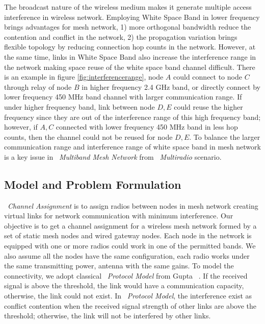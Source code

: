 The broadcast nature of the wireless medium makes it generate multiple access interference in wireless network.
Employing White Space Band in lower frequency brings advantages for mesh network, 1) more orthogonal bandwidth reduce the contention and conflict in the network,
 2) the propagation variation brings flexible topology by reducing connection hop counts in the network.
However, at the same time, links in White Space Band also increase the interference range in the network making space reuse of the white space band channel difficult. 
There is an example in figure \ref{fig:interferencerange}, node $A$  could connect to node $C$ through relay of node $B$ in higher frequency 2.4 GHz band, or directly connect by lower frequency 450 MHz band channel with larger communication range.
If under higher frequency band, link between node $D,E$ could reuse the higher frequency since they are out of the interference range of this high frequency band; 
however, if $A,C$ connected with lower frequency 450 MHz band in less hop counts, then the channel could not be reused for node $D,E$.
To balance the larger communication range and interference range of white space band in mesh network is a key issue in ~\emph{Multiband Mesh Network} from ~\emph{Multiradio} scenario.

\subsection{Model and Problem Formulation}
\label{subsec:problem}

~\emph{Channel Assignment} is to assign radios between nodes in mesh network creating virtual links for network communication with minimum interference.
Our objective is to get a channel assignment for a wireless mesh network formed by a set of static mesh nodes and wired gateway nodes. 
Each node in the network is equipped with one or more radios could work in one of the permitted bands. 
We also assume all the nodes have the same configuration, each radio works under the same transmitting power, antenna with the same gains.
To model the connectivity, we adopt classical ~\emph{Protocol Model} from Gupta ~\cite{gupta2000capacity}. If the received signal is above the threshold, the link would have a communication capacity, otherwise, the link could not exist.
In ~\emph{Protocol Model}, the interference exist as conflict contention when the received signal strength of other links are above the threshold; otherwise, the link will not be interfered by other links.

